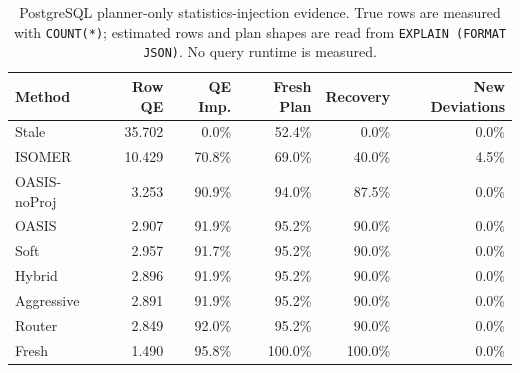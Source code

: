 \begin{table}[t]
  \centering
  \small
  \caption{PostgreSQL planner-only statistics-injection evidence. True rows are measured with \texttt{COUNT(*)}; estimated rows and plan shapes are read from \texttt{EXPLAIN (FORMAT JSON)}. No query runtime is measured.}
  \label{tab:postgres_planner_stats_injection}
  \setlength{\tabcolsep}{4pt}
  \begin{tabular}{lrrrrr}
    \toprule
    Method & Row QE & QE Imp. & Fresh Plan & Recovery & New Deviations \\
    \midrule
    Stale & 35.702 & 0.0\% & 52.4\% & 0.0\% & 0.0\% \\
    ISOMER & 10.429 & 70.8\% & 69.0\% & 40.0\% & 4.5\% \\
    OASIS-noProj & 3.253 & 90.9\% & 94.0\% & 87.5\% & 0.0\% \\
    OASIS & 2.907 & 91.9\% & 95.2\% & 90.0\% & 0.0\% \\
    Soft & 2.957 & 91.7\% & 95.2\% & 90.0\% & 0.0\% \\
    Hybrid & 2.896 & 91.9\% & 95.2\% & 90.0\% & 0.0\% \\
    Aggressive & 2.891 & 91.9\% & 95.2\% & 90.0\% & 0.0\% \\
    Router & 2.849 & 92.0\% & 95.2\% & 90.0\% & 0.0\% \\
    Fresh & 1.490 & 95.8\% & 100.0\% & 100.0\% & 0.0\% \\
    \bottomrule
  \end{tabular}
\end{table}
